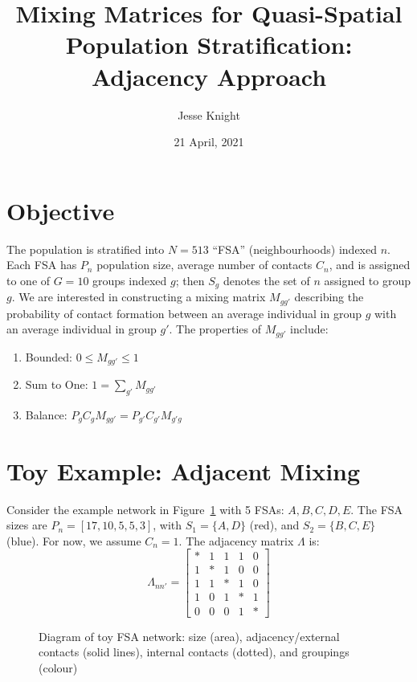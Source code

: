 \documentclass{article}
\title{Mixing Matrices for Quasi-Spatial Population Stratification:\\Adjacency Approach}
\date{21 April, 2021}
\author{Jesse Knight}
\begin{document}
  \maketitle
  \section{Objective}\label{s:obj}
  The population is stratified into $N = 513$ ``FSA'' (neighbourhoods) indexed $n$.
  Each FSA has $P_n$ population size, average number of contacts $C_n$,
  and is assigned to one of $G = 10$ groups indexed $g$;
  then $S_g$ denotes the set of $n$ assigned to group $g$.
  We are interested in constructing a mixing matrix $M_{gg'}$ describing
  the probability of contact formation between an average individual in group $g$
  with an average individual in group $g'$.
  The properties of $M_{gg'}$ include:
  \begin{enumerate}
    \item\label{c:bound}   Bounded:    $0 \le M_{gg'} \le 1$
    \item\label{c:sum}     Sum to One: $1 = \sum_{g'} M_{gg'}$
    \item\label{c:balance} Balance:    $P_g C_g M_{gg'} = P_{g'} C_{g'} M_{g'g}$
  \end{enumerate}
  \section{Toy Example: Adjacent Mixing}\label{s:toy}
  Consider the example network in Figure~\ref{fig:graph} with 5 FSAs: $A,B,C,D,E$.
  The FSA sizes are $P_n = [17,10,5,5,3]$, with $S_1 = \{A,D\}$ (red), and $S_2 = \{B,C,E\}$ (blue).
  For now, we assume $C_n = 1$.
  The adjacency matrix $\Lambda$ is:
  \begin{equation}
  \Lambda_{nn'} = \left[\begin{matrix}
  	* & 1 & 1 & 1 & 0 \\
  	1 & * & 1 & 0 & 0 \\
  	1 & 1 & * & 1 & 0 \\
  	1 & 0 & 1 & * & 1 \\
  	0 & 0 & 0 & 1 & *
  \end{matrix}\right]
  \end{equation}
  \begin{figure}
    \centering
    \caption{Diagram of toy FSA network:
      size (area), adjacency/external contacts (solid lines), internal contacts (dotted), and groupings (colour)}
    \label{fig:graph}
  \end{figure}
\end{document}
